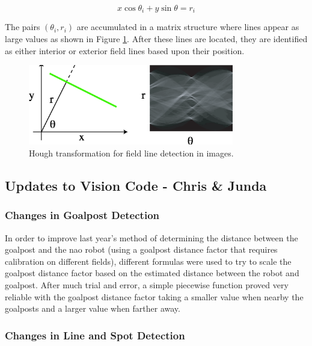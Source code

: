 \documentclass{article}
\begin{document}
	\begin{equation}
		x \cos \theta_{i} + y \sin \theta = r_{i} 
	\end{equation}

	The pairs \((\theta_{i},r_{i})\) are accumulated in a matrix structure where lines appear as large values as shown in Figure \ref{fig:Hough}. After these lines are located, they are identified as either interior or exterior field lines based upon their position.

	\begin{figure}[H]
		\centering
		\includegraphics[width=0.8\textwidth]{figures/Hough.eps}
		\caption{Hough transformation for field line detection in images.}
  		\label{fig:Hough}
	\end{figure}

\subsection{Updates to Vision Code - Chris \& Junda}


\subsubsection{Changes in Goalpost Detection}
	In order to improve last year's method of determining the distance between the goalpost and the nao robot (using a goalpost distance factor that requires calibration on different fields), different formulas were used to try to scale the goalpost distance factor based on the estimated distance between the robot and goalpost.  After much trial and error, a simple piecewise function proved very reliable with the goalpost distance factor taking a smaller value when nearby the goalposts and a larger value when farther away.  

\subsubsection{Changes in Line and Spot Detection} 
	
\end{document}
